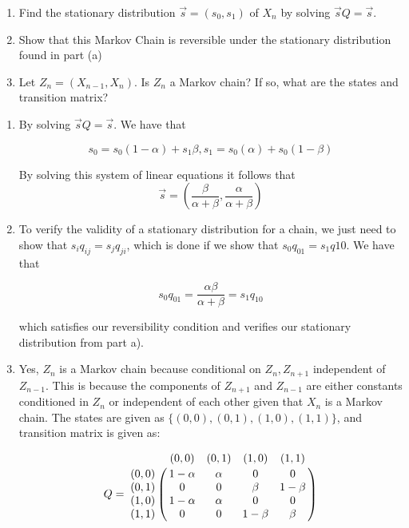 \documentclass[11pt]{article}
\begin{document}
{\begin{exercise}
\vskip 0.3in

\begin{enumerate}
  \item Find the stationary distribution $\vec{s} = (s_0, s_1)$ of $X_n$ by solving $\vec{s} Q = \vec{s}$.
  \item Show that this Markov Chain is reversible under the stationary distribution found in part (a)
  \item Let $Z_n = (X_{n-1}, X_n)$. Is $Z_n$ a Markov chain? If so, what are the states and transition matrix?
\end{enumerate}
\end{exercise}

\begin{solution}
\begin{enumerate}
\item By solving $\vec{s}Q = \vec{s}$. We have that

$$s_0 = s_0 (1-\alpha) + s_1 \beta, s_1 = s_0(\alpha) + s_0 (1-\beta)$$

\noindent By solving this system of linear equations it follows that $$\vec{s} = (\frac{\beta}{\alpha + \beta}, \frac{\alpha}{\alpha + \beta})$$

\item To verify the validity of a stationary distribution for a chain, we just need to show that $s_i q_{ij} = s_j q_{ji}$, which is done if we show that $s_0q_{01} = s_1q{10}$. We have that

$$s_0q_{01} = \frac{\alpha \beta}{\alpha + \beta} = s_1q_{10}$$

which satisfies our reversibility condition and verifies our stationary distribution from part a).

\item Yes, $Z_n$ is a Markov chain because conditional on $Z_n, Z_{n+1}$ independent of $Z_{n-1}$. This is because the components of $Z_{n+1}$ and $Z_{n-1}$ are either constants conditioned in $Z_n$ or independent of each other given that $X_n$ is a Markov chain. The states are given as $\{(0,0),(0,1),(1,0),(1,1)\}$, and transition matrix is given as:

\[
Q = \bordermatrix{~ & (0,0) & (0,1) & (1,0) & (1,1) \cr
                  (0,0) & 1-\alpha & \alpha & 0 & 0 \cr
                  (0,1) & 0 & 0 & \beta & 1-\beta \cr
                  (1,0) & 1-\alpha & \alpha & 0 & 0 \cr
                  (1,1) & 0 & 0 & 1-\beta & \beta \cr}
\]

\end{enumerate}


\end{solution}}
\end{document}
